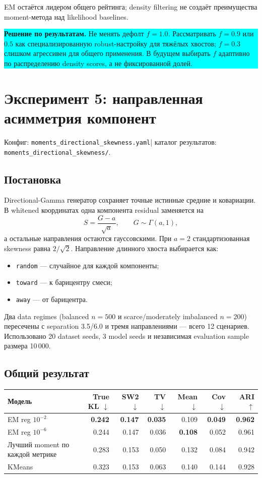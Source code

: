 \documentclass[11pt,a4paper]{article}
\newcommand{\code}[1]{{\footnotesize\nolinkurl{#1}}}
\newcommand{\best}[1]{\textbf{\color{green}#1}}
\newcommand{\decision}[1]{%
  \begin{center}
  \colorbox{cyan}{\parbox{0.94\linewidth}{%
    \textbf{\sffamily\color{navy}Решение по результатам.} #1}}
  \end{center}
}
\newcommand{\configlink}[1]{%
  \code{#1.yaml}}
\newcommand{\resultslink}[1]{%
  \code{#1/}}
\newcommand{\runrefs}[1]{%
  \small\color{midgray}%
  Конфиг: \configlink{#1}\enspace|\enspace
  каталог результатов: \resultslink{#1}.%
  \normalsize\color{black}}
\begin{document}
EM остаётся лидером общего рейтинга; density filtering не создаёт
преимущества moment-метода над likelihood baselines.

\decision{Не менять дефолт $f=1.0$. Рассматривать $f=0.9$ или $0.5$ как
специализированную robust-настройку для тяжёлых хвостов; $f=0.3$ слишком
агрессивен для общего применения. В будущем выбирать $f$ адаптивно по
распределению density scores, а не фиксированной долей.}

\section{Эксперимент 5: направленная асимметрия компонент}

\runrefs{moments_directional_skewness}

\subsection{Постановка}

Directional-Gamma генератор сохраняет точные истинные средние и ковариации.
В whitened координатах одна компонента residual заменяется на
\[
S=\frac{G-a}{\sqrt a},\qquad G\sim\Gamma(a,1),
\]
а остальные направления остаются гауссовскими. При $a=2$ стандартизованная
skewness равна $2/\sqrt{2}$. Направление длинного хвоста выбирается как:

\begin{itemize}
  \item \code{random} --- случайное для каждой компоненты;
  \item \code{toward} --- к барицентру смеси;
  \item \code{away} --- от барицентра.
\end{itemize}

Два data regimes (balanced $n=500$ и scarce/moderately imbalanced $n=200$)
пересечены с separation 3.5/6.0 и тремя направлениями --- всего 12
сценариев. Использовано 20 dataset seeds, 3 model seeds и независимая
evaluation sample размера 10\,000.

\subsection{Общий результат}

\begin{center}
\small
\begin{tabular}{@{}lrrrrrr@{}}
\toprule
\rowcolor{lightgray}
\textbf{Модель} & \textbf{True KL} $\downarrow$ & \textbf{SW2} $\downarrow$ &
\textbf{TV} $\downarrow$ & \textbf{Mean} $\downarrow$ &
\textbf{Cov} $\downarrow$ & \textbf{ARI} $\uparrow$\\
\midrule
EM reg $10^{-2}$ & \best{0.242} & \best{0.147} & \best{0.035} &
0.109 & \best{0.049} & \best{0.962}\\
EM reg $10^{-6}$ & 0.244 & 0.147 & 0.036 &
\best{0.108} & 0.052 & 0.961\\
Лучший moment по каждой метрике & 0.283 & 0.153 & 0.050 &
0.132 & 0.084 & 0.942\\
KMeans & 0.323 & 0.153 & 0.063 &
0.140 & 0.144 & 0.928\\
\bottomrule
\end{tabular}
\end{center}
\end{document}
